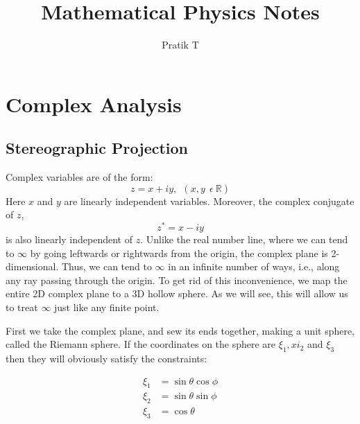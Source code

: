 \documentclass[12pt, letterpaper]{book}
\title{Mathematical Physics Notes}
\author{Pratik T}
\begin{document}

\chapter{Complex Analysis}

\section{Stereographic Projection}


Complex variables are of the form: $$z= x+ iy, \ \ (x,y\ \  \epsilon\  \mathbb{R}) $$
Here $x$ and $y$ are linearly independent variables. Moreover, the complex conjugate of $z$, $$z^*= x-iy$$ is also linearly independent of $z$.
Unlike the real number line, where we can tend to $\infty$ by going leftwards or rightwards from the origin, the complex plane is 2-dimensional. Thus, we can tend to $\infty$ in an infinite number of ways, i.e., along any ray passing through the origin. To get rid of this inconvenience, we map the entire 2D complex plane to a 3D hollow sphere. As we will see, this will allow us to treat $\infty$ just like any finite point. 

First we take the complex plane, and sew its ends together, making a unit sphere, called the Riemann sphere. If the coordinates on the sphere are $\xi_1, xi_2$ and $\xi_3$ then they will obviously satisfy the constraints: 

\begin{equation}
    \begin{aligned}
        \xi_1 &= \sin\theta\cos\phi\\
        \xi_2 &= \sin\theta\sin\phi\\
        \xi_3 &= \cos\theta 
    \end{aligned} \label{eq1}
\end{equation}
\end{document}
